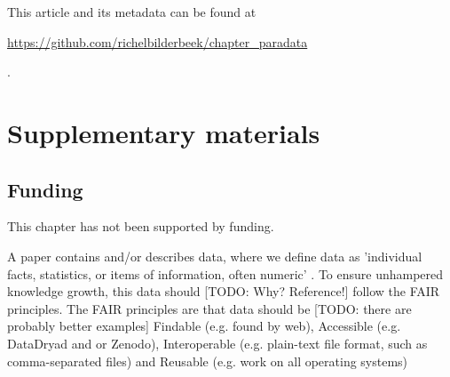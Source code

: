 This article and its metadata can be found at 
\begin{sloppypar}\url{https://github.com/richelbilderbeek/chapter_paradata}\end{sloppypar}.




\newpage
\appendix
\section{Supplementary materials}

\renewcommand{\thefigure}{S\arabic{figure}}
\setcounter{figure}{0}

\renewcommand{\thetable}{S\arabic{table}}
\setcounter{table}{0}

\subsection{Funding}

This chapter has not been supported by funding.
















A paper contains and/or describes data, where we define
data as 'individual facts, statistics, or items of information, often 
numeric' \cite{glossary2003oecd}.
To ensure unhampered knowledge growth, this data should [TODO: Why? Reference!] 
follow the FAIR 
principles.
The FAIR principles \cite{wilkinson2016fair} are that data should be 
[TODO: there are probably better examples]
Findable (e.g. found by web),
Accessible (e.g. DataDryad and or Zenodo), 
Interoperable (e.g. plain-text file format, such as comma-separated files) 
and Reusable (e.g. work on all operating systems)


